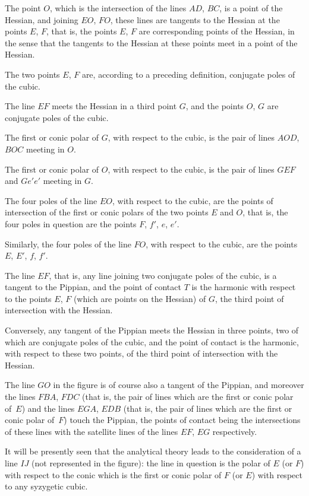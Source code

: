 \documentclass[11pt,a4paper]{book}
\begin{document}
\begin{center}
The point $O$, which is the intersection of the lines $AD$, $BC$,
is a point of the Hessian, and joining $EO$, $FO$, these lines
are tangents to the Hessian at the points $E$, $F$, that is, the
points $E$, $F$ are corresponding points of the Hessian, in the
sense that the tangents to the Hessian at these points meet
in a point of the Hessian.

The two points $E$, $F$ are, according to a preceding definition,
conjugate poles of the cubic.

The line $EF$ meets the Hessian in a third point $G$, and the
points $O$, $G$ are conjugate poles of the cubic.

The first or conic polar of $G$, with respect to the cubic, is
the pair of lines $AOD$, $BOC$ meeting in $O$.

The first or conic polar of $O$, with respect to the cubic, is
the pair of lines $GEF$ and $Ge'e'$ meeting in $G$.

The four poles of the line $EO$, with respect to the cubic, are
the points of intersection of the first or conic polars of the two
points $E$ and $O$, that is, the four poles in question are the
points $F$, $f'$, $e$, $e'$.

Similarly, the four poles of the line $FO$, with respect to the
cubic, are the points $E$, $E'$, $f$, $f'$.

The line $EF$, that is, any line joining two conjugate poles
of the cubic, is a tangent to the Pippian, and the point of
contact $T$ is the harmonic with respect to the points $E$, $F$
(which are points on the Hessian) of $G$, the third point of
intersection with the Hessian.

Conversely, any tangent of the Pippian meets the Hessian
in three points, two of which are conjugate poles of the cubic,
and the point of contact is the harmonic, with respect to these
two points, of the third point of intersection with the Hessian.

The line $GO$ in the figure is of course also a tangent of the
Pippian, and moreover the lines $FBA$, $FDC$ (that is, the pair
of lines which are the first or conic polar of~$E$) and the lines
$EGA$, $EDB$ (that is, the pair of lines which are the first or
conic polar of~$F$) touch the Pippian, the points of contact
being the intersections of these lines with the satellite lines
of the lines $EF$, $EG$ respectively.

It will be presently seen that the analytical theory leads to
the consideration of a line $IJ$ (not represented in the figure):
the line in question is the polar of $E$ (or $F$) with respect to
the conic which is the first or conic polar of $F$ (or $E$) with
respect to any syzygetic cubic.


\end{center}
\end{document}
